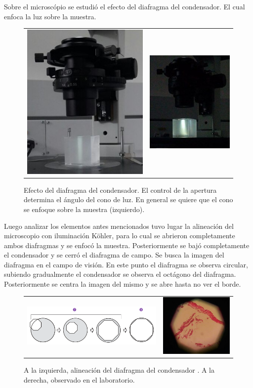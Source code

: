 \documentclass[addpoints,10pt]{exam}
\begin{document}
	\newpage
	Sobre el microsc\'opio se estudi\'o el efecto del diafragma del condensador. El cual enfoca la luz sobre la muestra.
	\begin{figure}[h]
		\centering
		\begin{tabular}{cc}
			\includegraphics[width = 0.3\linewidth]{condensador1.jpg} &
			\includegraphics[width = 0.3\linewidth]{condensador2.jpg}
		\end{tabular}
		\caption{Efecto del diafragma del condensador. El control de la apertura determina el \'angulo del cono de luz. En general se quiere que el cono se enfoque sobre la muestra (izquierdo).}
	\end{figure}
	
	Luego analizar los elementos antes mencionados tuvo lugar la alineaci\'on del microscopio con iluminaci\'on K\"ohler, para lo cual se abrieron completamente ambos diafragmas y se enfoc\'o la muestra. Posteriormente se baj\'o completamente el condensador y se cerr\'o el diafragma de campo. Se busca la imagen del diafragma en el campo de visi\'on. En este punto el diafragma se observa circular, subiendo gradualmente el condensador se observa el oct\'agono del diafragma. Posteriormente se centra la imagen del mismo y se abre hasta no ver el borde.
	\begin{figure}[h]
		\centering
		\begin{tabular}{cc}
			\includegraphics[width=0.5\linewidth]{alineacion.png} & 
			\includegraphics[width=0.2\linewidth]{alineacion.jpg}
		\end{tabular}
		\caption{A la izquierda, alineaci\'on del diafragma del condensador \cite{Olympus}. A la derecha, observado en el laboratorio.}
	\end{figure}
	
\end{document}
